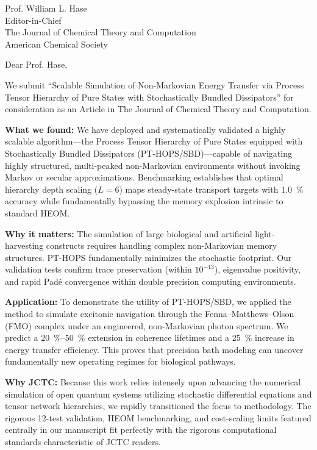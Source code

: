 \documentclass[11pt,a4paper]{letter}
\begin{document}
\begin{letter}{
Prof. William L. Hase \\
Editor-in-Chief\\
The Journal of Chemical Theory and Computation\\
American Chemical Society
}

\opening{Dear Prof. Hase,}

We submit ``Scalable Simulation of Non-Markovian Energy Transfer via Process Tensor Hierarchy of Pure States with Stochastically Bundled Dissipators'' for consideration as an Article in The Journal of Chemical Theory and Computation.

\textbf{What we found:} We have deployed and systematically validated a highly scalable algorithm---the Process Tensor Hierarchy of Pure States equipped with Stochastically Bundled Dissipators (PT-HOPS/SBD)---capable of navigating highly structured, multi-peaked non-Markovian environments without invoking Markov or secular approximations. Benchmarking establishes that optimal hierarchy depth scaling ($L=6$) maps steady-state transport targets with \SI{1.0}{\percent} accuracy while fundamentally bypassing the memory explosion intrinsic to standard HEOM. 

\textbf{Why it matters:} The simulation of large biological and artificial light-harvesting constructs requires handling complex non-Markovian memory structures. PT-HOPS fundamentally minimizes the stochastic footprint. Our validation tests confirm trace preservation (within $10^{-13}$), eigenvalue positivity, and rapid Padé convergence within double precision computing environments. 

\textbf{Application:} To demonstrate the utility of PT-HOPS/SBD, we applied the method to simulate excitonic navigation through the Fenna--Matthews--Olson (FMO) complex under an engineered, non-Markovian photon spectrum. We predict a \SIrange{20}{50}{\percent} extension in coherence lifetimes and a \SI{25}{\percent} increase in energy transfer efficiency. This proves that precision bath modeling can uncover fundamentally new operating regimes for biological pathways.

\textbf{Why JCTC:} Because this work relies intensely upon advancing the numerical simulation of open quantum systems utilizing stochastic differential equations and tensor network hierarchies, we rapidly transitioned the focus to methodology. The rigorous 12-test validation, HEOM benchmarking, and cost-scaling limits featured centrally in our manuscript fit perfectly with the rigorous computational standards characteristic of JCTC readers.


\end{letter}
\end{document}
